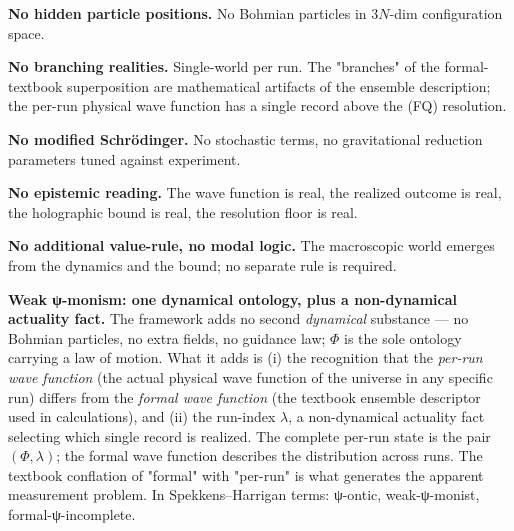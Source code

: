 \documentclass[11pt,a4paper]{article}
\begin{document}
\textbf{No hidden particle positions.} No Bohmian particles in $3N$-dim configuration space.

\textbf{No branching realities.} Single-world per run. The "branches" of the formal-textbook superposition are mathematical artifacts of the ensemble description; the per-run physical wave function has a single record above the (FQ) resolution.

\textbf{No modified Schrödinger.} No stochastic terms, no gravitational reduction parameters tuned against experiment.

\textbf{No epistemic reading.} The wave function is real, the realized outcome is real, the holographic bound is real, the resolution floor is real.

\textbf{No additional value-rule, no modal logic.} The macroscopic world emerges from the dynamics and the bound; no separate rule is required.

\textbf{Weak ψ-monism: one dynamical ontology, plus a non-dynamical actuality fact.} The framework adds no second \emph{dynamical} substance — no Bohmian particles, no extra fields, no guidance law; $\Phi$ is the sole ontology carrying a law of motion. What it adds is (i) the recognition that the \emph{per-run wave function} (the actual physical wave function of the universe in any specific run) differs from the \emph{formal wave function} (the textbook ensemble descriptor used in calculations), and (ii) the run-index $\lambda$, a non-dynamical actuality fact selecting which single record is realized. The complete per-run state is the pair $(\Phi, \lambda)$; the formal wave function describes the distribution across runs. The textbook conflation of "formal" with "per-run" is what generates the apparent measurement problem. In Spekkens–Harrigan terms: ψ-ontic, weak-ψ-monist, formal-ψ-incomplete.
\end{document}
